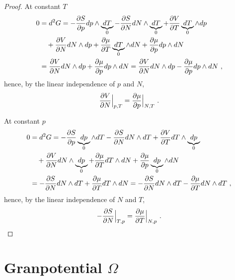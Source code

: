 \begin{proof}
        At constant $T$ 
        \begin{equation*}
        \begin{aligned}
            0 & = d^2 G = - \frac{\partial S}{\partial p} dp \wedge \underbrace{dT}_0 - \frac{\partial S}{\partial N} dN \wedge \underbrace{dT}_0 + \frac{\partial V}{\partial T} \underbrace{dT}_0 \wedge dp \\ & \quad + \frac{\partial V}{\partial N} dN \wedge dp + \frac{\partial\mu}{\partial T} \underbrace{dT}_0 \wedge dN + \frac{\partial\mu}{\partial p} dp \wedge dN \\ & = \frac{\partial V}{\partial N} dN \wedge dp + \frac{\partial\mu}{\partial p} dp \wedge dN = \frac{\partial V}{\partial N} dN \wedge dp - \frac{\partial\mu}{\partial p} dp \wedge dN ~,
        \end{aligned}
        \end{equation*}
        hence, by the linear independence of $p$ and $N$,
        \begin{equation*}
            \frac{\partial V}{\partial N} \Big \vert_{p,T} = \frac{\partial\mu}{\partial p} \Big \vert_{N, T} ~.
        \end{equation*}

        At constant $p$ 
        \begin{equation*}
        \begin{aligned}
            0 & = d^2 G = - \frac{\partial S}{\partial p} \underbrace{dp}_0 \wedge dT - \frac{\partial S}{\partial N} dN \wedge dT + \frac{\partial V}{\partial T} dT \wedge \underbrace{dp}_0 \\ & \quad + \frac{\partial V}{\partial N} dN \wedge \underbrace{dp}_0 + \frac{\partial\mu}{\partial T} dT \wedge dN + \frac{\partial\mu}{\partial p} \underbrace{dp}_0 \wedge dN \\ & = - \frac{\partial S}{\partial N} dN \wedge dT + \frac{\partial\mu}{\partial T} dT \wedge dN = - \frac{\partial S}{\partial N} dN \wedge dT - \frac{\partial\mu}{\partial T} dN \wedge dT ~,
        \end{aligned}
        \end{equation*}
        hence, by the linear independence of $N$ and $T$,
        \begin{equation*}
            - \frac{\partial S}{\partial N} \Big \vert_{T,p} = \frac{\partial\mu}{\partial T} \Big \vert_{N, p} ~.
        \end{equation*}

    \end{proof}

\section{Granpotential $\Omega$} 

